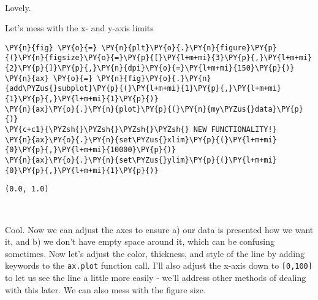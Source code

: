     \begin{center}
    \end{center}
    { \hspace*{\fill} \\}
    
    Lovely.

Let's mess with the x- and y-axis limits

    \begin{tcolorbox}[breakable, size=fbox, boxrule=1pt, pad at break*=1mm,colback=cellbackground, colframe=cellborder]
\begin{Verbatim}[commandchars=\\\{\}]
\PY{n}{fig} \PY{o}{=} \PY{n}{plt}\PY{o}{.}\PY{n}{figure}\PY{p}{(}\PY{n}{figsize}\PY{o}{=}\PY{p}{[}\PY{l+m+mi}{3}\PY{p}{,}\PY{l+m+mi}{2}\PY{p}{]}\PY{p}{,}\PY{n}{dpi}\PY{o}{=}\PY{l+m+mi}{150}\PY{p}{)} 
\PY{n}{ax} \PY{o}{=} \PY{n}{fig}\PY{o}{.}\PY{n}{add\PYZus{}subplot}\PY{p}{(}\PY{l+m+mi}{1}\PY{p}{,}\PY{l+m+mi}{1}\PY{p}{,}\PY{l+m+mi}{1}\PY{p}{)}
\PY{n}{ax}\PY{o}{.}\PY{n}{plot}\PY{p}{(}\PY{n}{my\PYZus{}data}\PY{p}{)}
\PY{c+c1}{\PYZsh{}\PYZsh{}\PYZsh{}\PYZsh{} NEW FUNCTIONALITY!}
\PY{n}{ax}\PY{o}{.}\PY{n}{set\PYZus{}xlim}\PY{p}{(}\PY{l+m+mi}{0}\PY{p}{,}\PY{l+m+mi}{10000}\PY{p}{)}
\PY{n}{ax}\PY{o}{.}\PY{n}{set\PYZus{}ylim}\PY{p}{(}\PY{l+m+mi}{0}\PY{p}{,}\PY{l+m+mi}{1}\PY{p}{)}
\end{Verbatim}
\end{tcolorbox}

            \begin{tcolorbox}[breakable, size=fbox, boxrule=.5pt, pad at break*=1mm, opacityfill=0]
\begin{Verbatim}[commandchars=\\\{\}]
(0.0, 1.0)
\end{Verbatim}
\end{tcolorbox}
        
    \begin{center}
    \end{center}
    { \hspace*{\fill} \\}
    
    Cool. Now we can adjust the axes to ensure a) our data is presented how
we want it, and b) we don't have empty space around it, which can be
confusing sometimes. Now let's adjust the color, thickness, and style of
the line by adding keywords to the \texttt{ax.plot} function call. I'll
also adjust the x-axis down to \texttt{{[}0,100{]}} to let us see the
line a little more easily - we'll address other methods of dealing with
this later. We can also mess with the figure size.

